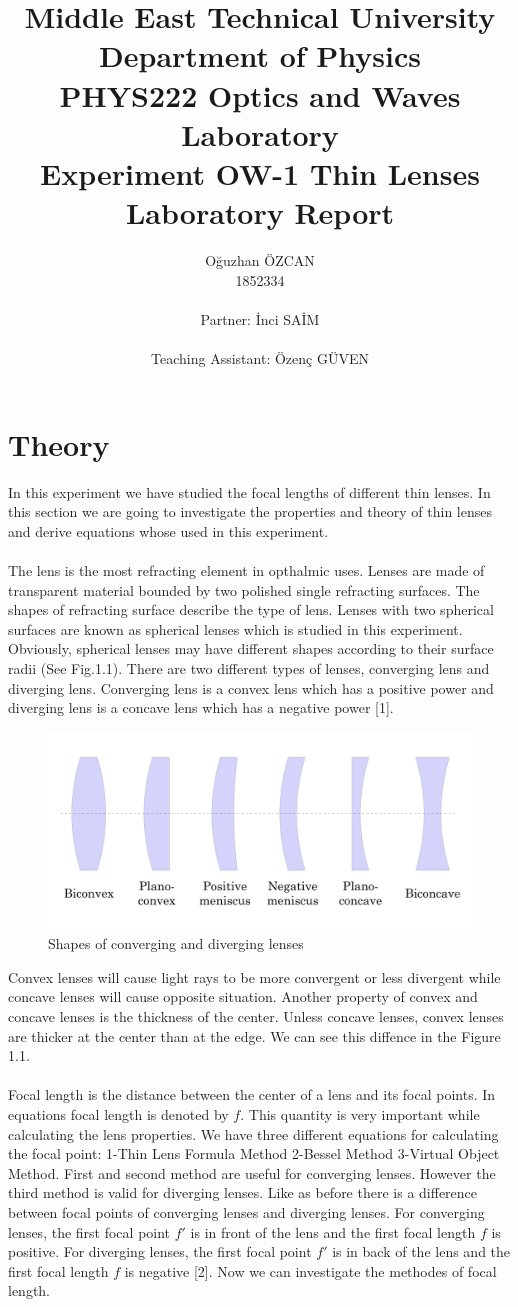 \documentclass[a4paper,12pt]{report}
\title{Middle East Technical University\\Department of Physics\\PHYS222 Optics and Waves Laboratory\\\textbf{Experiment OW-1 Thin Lenses\\Laboratory Report}}
\author{Oğuzhan ÖZCAN\\1852334\\\\Partner: İnci SAİM\\\\Teaching Assistant: Özenç GÜVEN}
\begin{document}
\maketitle
\tableofcontents
\listoffigures
\listoftables
\chapter{Theory}
In this experiment we have studied the focal lengths of different thin lenses. In this section we are going to investigate the properties and theory of thin lenses and derive equations whose used in this experiment.\\\\
The lens is the most refracting element in opthalmic uses. Lenses are made of transparent material bounded by two polished single refracting surfaces. The shapes of refracting surface describe the type of lens. Lenses with two spherical surfaces are known as spherical lenses which is studied in this experiment. Obviously, spherical lenses may have different shapes according to their surface radii (See Fig.1.1). There are two different types of lenses, converging lens and diverging lens. Converging lens is a convex lens which has a positive power and diverging lens is a concave lens which has a negative power [1].  
\begin{figure}[h]
\centering
\includegraphics[width=0.82\linewidth, height=0.20\textheight]{"Type of Lenses"}
\caption{Shapes of converging and diverging lenses}
\label{fig:TypeofLenses}
\end{figure}
Convex lenses will cause light rays to be more convergent or less divergent while concave lenses will cause opposite situation. Another property of convex and concave lenses is the thickness of the center. Unless concave lenses, convex lenses are thicker at the center than at the edge. We can see this diffence in the Figure 1.1. 
\\\\
Focal length is the distance between the center of a lens and its focal points. In equations focal length is denoted by $f$. This quantity is very important while calculating the lens properties. We have three different equations for calculating the focal point: 1-Thin Lens Formula Method 2-Bessel Method 3-Virtual Object Method. First and second method are useful for converging lenses. However the third method is valid for diverging lenses. Like as before there is a difference between focal points of converging lenses and diverging lenses. For converging lenses, the first focal point $f'$ is in front of the lens and the first focal length $f$ is positive. For diverging lenses, the first focal point $f'$ is in back of the lens and the first focal length $f$ is negative [2]. Now we can investigate the methodes of focal length.
\end{document}
